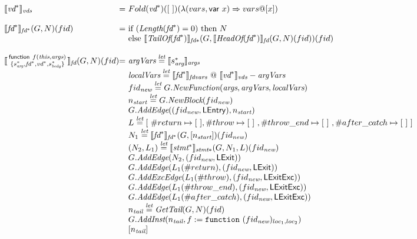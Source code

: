 \[\begin{array}{l@{}l@{~}l}
\transfun{\emph{vd}^*}_{\emph{vds}} & = &
	Fold(\emph{vd}^*)([\ ])(\lambda(vars, \irvar{x})\Rightarrow vars @ [x])\\
	& & \\

\transfun{\emph{fd}^*}_{\emph{fd}^*}(G,N)(fid) & = &
	\mbox{if}\ (\Length(\emph{fd}^*) = 0)\ \mbox{then}\ N\\
	& & \mbox{else}\ \transfun{\TailOf(\emph{fd}^*)}_{\emph{fd}*}(G, \transfun{\HeadOf(\emph{fd}^*)}_{\emph{fd}}(G,N)(fid))(fid)\\
	& & \\

\transfun{\irfundeclsmall{f}{\emph{this}}{\emph{args}}{s_{\emph{arg}}^*}{\emph{fd}^*}{\emph{vd}^*}{s_{\emph{body}}^*}}_{\emph{fd}}(G,N)(fid) & = &
	\argVars \letval \transfun{s_{\emph{arg}}^*}_{\emph{args}} \\
	& & \localVars \letval \transfun{\emph{fd}^*}_{\emph{fdvars}} ~@~ \transfun{\emph{vd}^*}_{\emph{vds}} - \argVars \\
	& & fid_{\emph{new}} \letval G.\emph{NewFunction}(\emph{args}, \argVars, \localVars)\\
	& & n_{\emph{start}} \letval G.\emph{NewBlock}(fid_{\emph{new}})\\
	& & G.\emph{AddEdge}((fid_{\emph{new}},\LEntry), n_{\emph{start}})\\
	& & L \letval [\ \#return \mapsto [\ ], \#throw \mapsto [\ ]\ , \#throw\_end \mapsto [\ ]\  , \#after\_catch \mapsto [\ ]\ ] \\
	& & N_1 \letval \transfun{\emph{fd}^*}_{\emph{fd}^*}(G,[n_{\emph{start}}])(fid_{\emph{new}})\\
	& & (N_2,L_1) \letval \transfun{\emph{stmt}^*}_{\emph{stmt}*}(G,N_1,L)(fid_{\emph{new}})\\
	& & G.\emph{AddEdge}(N_2,(fid_{\emph{new}},\LExit))\\
	& & G.\emph{AddEdge}(L_1(\#return),(fid_{\emph{new}},\LExit))\\
	& & G.\emph{AddExcEdge}(L_1(\#throw),(fid_{\emph{new}},\LExitExc))\\
	& & G.\emph{AddEdge}(L_1(\#throw\_end),(fid_{\emph{new}},\LExitExc))\\
	& & G.\emph{AddEdge}(L_1(\#after\_catch),(fid_{\emph{new}},\LExitExc))\\
	& & n_{\emph{tail}} \letval \GetTail(G,N)(fid)\\
	& & G.\emph{AddInst}(n_{\emph{tail}},f := \TT{function}\ (fid_{\emph{new}})_{loc_1,loc_2})\\
	& & [n_{\emph{tail}}]\\
	& & \\
\end{array}
\]

